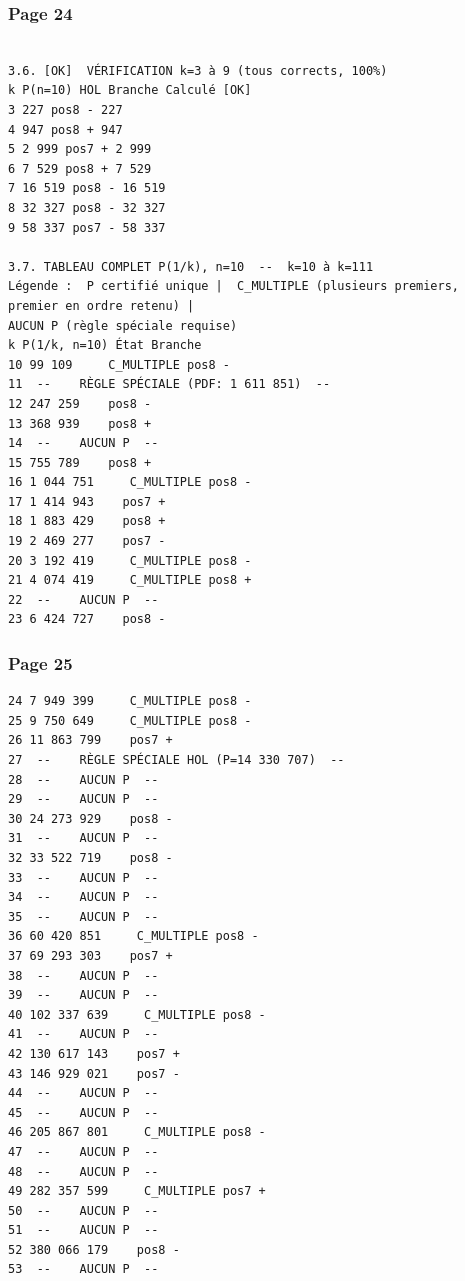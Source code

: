 \documentclass[11pt,a4paper]{article}
\begin{document}
\subsubsection*{Page 24}
\begin{Verbatim}[fontsize=\footnotesize]
 
3.6. [OK]  VÉRIFICATION k=3 à 9 (tous corrects, 100%) 
k P(n=10) HOL Branche Calculé [OK] 
3 227 pos8 - 227    
4 947 pos8 + 947    
5 2 999 pos7 + 2 999    
6 7 529 pos8 + 7 529    
7 16 519 pos8 - 16 519    
8 32 327 pos8 - 32 327    
9 58 337 pos7 - 58 337    
 
3.7. TABLEAU COMPLET P(1/k), n=10  --  k=10 à k=111 
Légende :  P certifié unique |  C_MULTIPLE (plusieurs premiers, premier en ordre retenu) |  
AUCUN P (règle spéciale requise) 
k P(1/k, n=10) État Branche 
10 99 109     C_MULTIPLE pos8 - 
11  --    RÈGLE SPÉCIALE (PDF: 1 611 851)  --  
12 247 259    pos8 - 
13 368 939    pos8 + 
14  --    AUCUN P  --  
15 755 789    pos8 + 
16 1 044 751     C_MULTIPLE pos8 - 
17 1 414 943    pos7 + 
18 1 883 429    pos8 + 
19 2 469 277    pos7 - 
20 3 192 419     C_MULTIPLE pos8 - 
21 4 074 419     C_MULTIPLE pos8 + 
22  --    AUCUN P  --  
23 6 424 727    pos8 - 
\end{Verbatim}
\medskip
\subsubsection*{Page 25}
\begin{Verbatim}[fontsize=\footnotesize]
24 7 949 399     C_MULTIPLE pos8 - 
25 9 750 649     C_MULTIPLE pos8 - 
26 11 863 799    pos7 + 
27  --    RÈGLE SPÉCIALE HOL (P=14 330 707)  --  
28  --    AUCUN P  --  
29  --    AUCUN P  --  
30 24 273 929    pos8 - 
31  --    AUCUN P  --  
32 33 522 719    pos8 - 
33  --    AUCUN P  --  
34  --    AUCUN P  --  
35  --    AUCUN P  --  
36 60 420 851     C_MULTIPLE pos8 - 
37 69 293 303    pos7 + 
38  --    AUCUN P  --  
39  --    AUCUN P  --  
40 102 337 639     C_MULTIPLE pos8 - 
41  --    AUCUN P  --  
42 130 617 143    pos7 + 
43 146 929 021    pos7 - 
44  --    AUCUN P  --  
45  --    AUCUN P  --  
46 205 867 801     C_MULTIPLE pos8 - 
47  --    AUCUN P  --  
48  --    AUCUN P  --  
49 282 357 599     C_MULTIPLE pos7 + 
50  --    AUCUN P  --  
51  --    AUCUN P  --  
52 380 066 179    pos8 - 
53  --    AUCUN P  --  
\end{Verbatim}
\medskip
\end{document}
